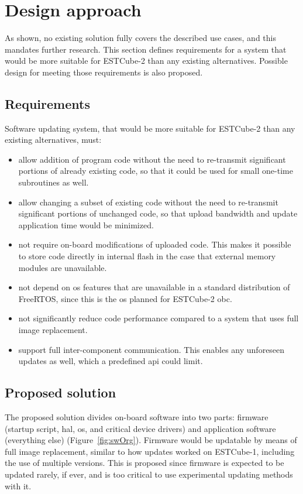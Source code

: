 \newpage
\section{Design approach}
\label{s:design}

As shown, no existing solution fully covers the described use cases, and this mandates further research. This section defines requirements for a system that would be more suitable for ESTCube-2 than any existing alternatives. Possible design for meeting those requirements is also proposed.

\subsection{Requirements}

Software updating system, that would be more suitable for ESTCube-2 than any existing alternatives, must:

\begin{itemize}
	\item allow addition of program code without the need to re-transmit significant portions of already existing code, so that it could be used for small one-time subroutines as well.
	\item allow changing a subset of existing code without the need to re-transmit significant portions of unchanged code, so that upload bandwidth and update application time would be minimized.
	\item not require on-board modifications of uploaded code. This makes it possible to store code directly in internal flash in the case that external memory modules are unavailable.
	\item not depend on \gls{os} features that are unavailable in a standard distribution of Free\-RTOS, since this is the \gls{os} planned for ESTCube-2 \gls{obc}.
	\item not significantly reduce code performance compared to a system that uses full image replacement.
	\item support full inter-component communication. This enables any unforeseen updates as well, which a predefined \gls{api} could limit.
\end{itemize}

\subsection{Proposed solution}

The proposed solution divides on-board software into two parts: firmware (startup script, \gls{hal}, \gls{os}, and critical device drivers) and application software (everything else) (Figure~\ref{fig:swOrg}). Firmware would be updatable by means of full image replacement, similar to how updates worked on ESTCube-1, including the use of multiple versions. This is proposed since firmware is expected to be updated rarely, if ever, and is too critical to use experimental updating methods with it.

